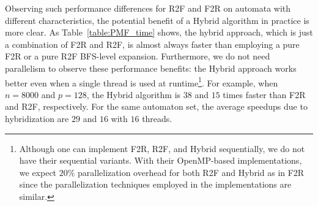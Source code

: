 \documentclass[12pt]{article}
\begin{document}
Observing such performance differences for R2F and F2R on automata with different characteristics, the potential benefit of a Hybrid algorithm in practice is more clear. As Table~\ref{table:PMF_time} shows, the hybrid approach, which is just a combination of F2R and R2F, is almost always faster than employing a pure F2R or a pure R2F BFS-level expansion. Furthermore, we do not need parallelism to observe these performance benefits: the Hybrid approach works better even when a single thread is used at runtime\footnote{Although one can implement F2R, R2F, and Hybrid sequentially, we do not have their sequential variants. With their OpenMP-based implementations, we expect $20\%$ parallelization overhead for both R2F and Hybrid as in F2R since the parallelization techniques employed in the implementations  are similar.}. For example, when $n = 8000$ and $p = 128$, the Hybrid algorithm is $38$ and $15$ times faster than F2R and R2F, respectively. For the same automaton set, the average speedups due to hybridization are $29$ and $16$ with $16$ threads.
\end{document}

